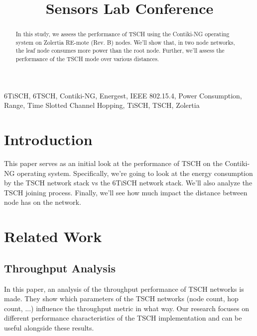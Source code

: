 \documentclass[conference]{IEEEtran}
\begin{document}
\title{Sensors Lab Conference}

\author{
\and
}

\maketitle

\begin{abstract}
In this study, we assess the performance of TSCH using the Contiki-NG operating system on Zolertia RE-mote (Rev. B) nodes. We'll show that, in two node networks, the leaf node consumes more power than the root node. Further, we'll assess the performance of the TSCH mode over various distances.
\end{abstract}

\begin{IEEEkeywords}
6TiSCH, 6TSCH, Contiki-NG, Energest, IEEE 802.15.4, Power Consumption, Range, Time Slotted Channel Hopping, TiSCH, TSCH, Zolertia
\end{IEEEkeywords}

\section{Introduction}
This paper serves as an initial look at the performance of TSCH on the Contiki-NG operating system. Specifically, we're going to look at the energy consumption by the TSCH network stack vs the 6TiSCH network stack. We'll also analyze the TSCH joining process. Finally, we'll see how much impact the distance between node has on the network. 

\section{Related Work}
\subsection{Throughput Analysis} \cite{ThroughputEvaluation} In this paper, an analysis of the throughput performance of TSCH networks is made. They show which parameters of the TSCH networks (node count, hop count, ...) influence the throughput metric in what way. Our research focuses on different performance characteristics of the TSCH implementation and can be useful alongside these results. 
\end{document}
